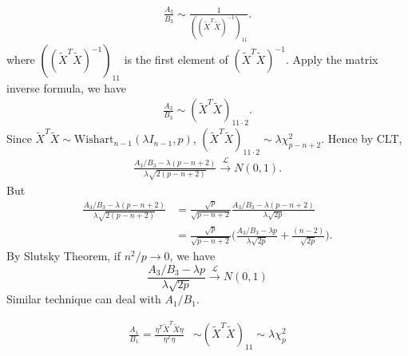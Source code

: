 \documentclass[review]{elsarticle}
\theoremstyle{plain}
\theoremstyle{definition}
\theoremstyle{remark}
\begin{document}
\begin{equation}
    \begin{aligned}
        \frac{A_3}{B_3}\sim 
        \frac{1}{{({(\tilde{X}^T\tilde{X})}^{-1})}_{11}}.
    \end{aligned}
\end{equation}
where ${({(\tilde{X}^T\tilde{X})}^{-1})}_{11}$ is the first element of ${(\tilde{X}^T\tilde{X})}^{-1}$. Apply the matrix inverse formula, we have 
\begin{equation}
    \begin{aligned}
        \frac{A_3}{B_3}\sim 
        {(\tilde{X}^T\tilde{X})}_{11\cdot 2}.
    \end{aligned}
\end{equation}
Since $\tilde{X}^T \tilde{X}\sim \textrm{Wishart}_{n-1}(\lambda I_{n-1},p)$, ${(\tilde{X}^T\tilde{X})}_{11\cdot 2}\sim \lambda \chi^2_{p-n+2}$.
Hence by CLT,
\begin{equation}
    \begin{aligned}
        \frac{A_3/B_3-\lambda (p-n+2)}{\lambda\sqrt{2(p-n+2)}
        }\xrightarrow{\mathcal{L}}N(0,1).
    \end{aligned}
\end{equation}
But
\begin{equation}
    \begin{aligned}
        \frac{A_3/B_3-\lambda (p-n+2)}{\lambda\sqrt{2(p-n+2)}
        }&=
        \frac{\sqrt{p}}{\sqrt{p-n+2}}
        \frac{A_3/B_3-{\lambda(p-n+2)}}{\lambda\sqrt{2p}
        }\\
        &=
        \frac{\sqrt{p}}{\sqrt{p-n+2}}
        \Big(\frac{A_3/B_3-{\lambda p}}{\lambda\sqrt{2p}
        }+\frac{(n-2)}{\sqrt{2p}}\Big).
    \end{aligned}
\end{equation}
By Slutsky Theorem, if $n^2/p\to 0$, we have
\begin{equation}
    \frac{A_3/B_3-{\lambda p}}{\lambda\sqrt{2p}
        }\xrightarrow{\mathcal{L}}N(0,1)
\end{equation}
Similar technique can deal with $A_1/B_1$.

\begin{equation}
    \begin{aligned}
        \frac{A_1}{B_1}=\frac{\eta^T \tilde{X}^T\tilde{X} \eta    
        }{\eta^T\eta}&\sim {(\tilde{X}^T\tilde{X})}_{11}\sim \lambda \chi^2_{p}
\\
    \end{aligned}
\end{equation}
\end{document}
